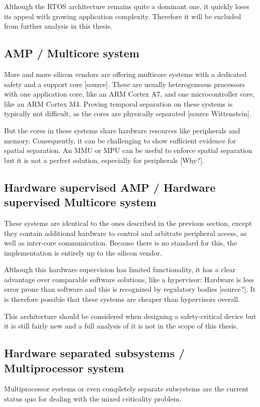 Although the RTOS architecture remains quite a dominant one, it quickly loses its appeal with growing application complexity. Therefore it will be excluded from further analysis in this thesis.
\subsection{AMP / Multicore system}
More and more silicon vendors are offering multicore systems with a dedicated safety and a support core [source]. These are usually heterogeneous processors with one application core, like an ARM Cortex A7, and one microcontroller core, like an ARM Cortex M4. Proving temporal separation on these systems is typically not difficult, as the cores are physically separated [source Wittenstein].

But the cores in these systems share hardware resources like peripherals and memory. Consequently, it can be challenging to show sufficient evidence for spatial separation. An \gls{MMU} or \gls{MPU} can be useful to enforce spatial separation but it is not a perfect solution, especially for peripherals [Why?]. 
\subsection{Hardware supervised AMP / Hardware supervised Multicore system}
These systems are identical to the ones described in the previous section, except they contain additional hardware to control and arbitrate peripheral access, as well as inter-core communication.
Because there is no standard for this, the implementation is entirely up to the silicon vendor. 

Although this hardware supervision has limited functionality, it has a clear advantage over comparable software solutions, like a hypervisor: Hardware is less error prone than software and this is recognized by regulatory bodies [source?]. It is therefore possible that these systems are cheaper than hypervisors overall. 

This architecture should be considered when designing a safety-critical device but it is still fairly new and a full analysis of it is not in the scope of this thesis.
\subsection{Hardware separated subsystems / Multiprocessor system}
Multiprocessor systems or even completely separate subsystems are the current status quo for dealing with the mixed criticality problem. 



